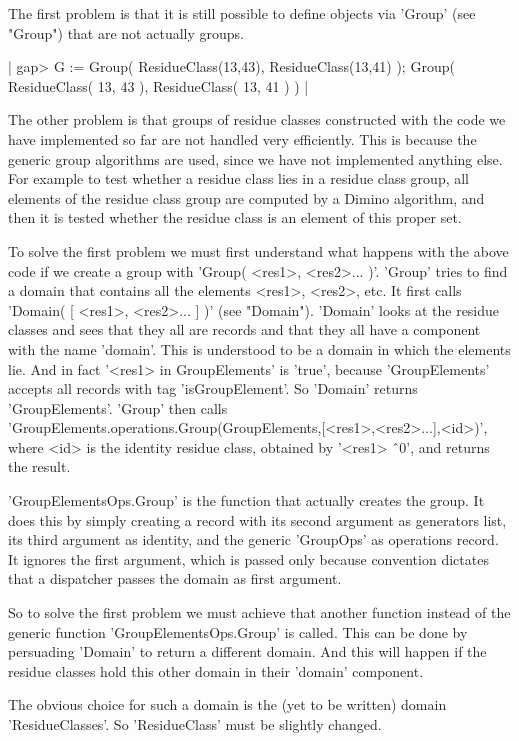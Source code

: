 The first  problem is that   it is still  possible to  define objects via
'Group' (see "Group") that are not actually groups.

|    gap> G := Group( ResidueClass(13,43), ResidueClass(13,41) );
    Group( ResidueClass( 13, 43 ), ResidueClass( 13, 41 ) ) |

The other problem is that  groups of residue classes constructed with the
code  we have  implemented so far are not handled very efficiently.  This
is  because the generic group algorithms are  used,  since  we  have  not
implemented anything else.  For example to test whether  a  residue class
lies in  a residue class group, all elements of  the residue  class group
are computed by  a  Dimino  algorithm, and  then it is tested whether the
residue class is an element of this proper set.

To solve the first problem we must first understand what happens with the
above code if we create   a  group with 'Group(  <res1>, <res2>...    )'.
'Group' tries  to find a  domain that contains  all  the elements <res1>,
<res2>,  etc.  It first calls 'Domain(  [ <res1>, <res2>...    ] )'  (see
"Domain").  'Domain' looks at the residue classes  and sees that they all
are records  and that they all have  a component with  the name 'domain'.
This is understood to be a domain in which the elements lie.  And in fact
'<res1> in GroupElements' is 'true', because  'GroupElements' accepts all
records with tag 'isGroupElement'.  So 'Domain'  returns 'GroupElements'.
'Group' then calls\\
'GroupElements.operations.Group(GroupElements,[<res1>,<res2>...],<id>)',
where <id> is the identity residue class, obtained by '<res1> \^\ 0', and
returns the result.

'GroupElementsOps.Group' is the function that actually creates the group.
It does   this by simply creating  a  record with its  second argument as
generators  list,  its  third  argument  as   identity, and  the  generic
'GroupOps' as operations record.  It ignores the first argument, which is
passed  only because convention  dictates that  a  dispatcher passes  the
domain as first argument.

So  to solve  the first problem   we must achieve  that another  function
instead of the generic function 'GroupElementsOps.Group' is called.  This
can  be  done by persuading 'Domain' to  return a different  domain.  And
this will happen if the residue  classes hold this  other domain in their
'domain' component.

The obvious choice for such a  domain is  the (yet to be written)  domain
'ResidueClasses'.  So 'ResidueClass' must be slightly changed.

